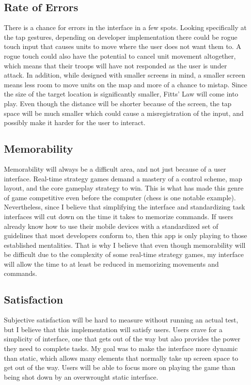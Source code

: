 \documentclass[11pt]{article}
\begin{document}
	\subsection{Rate of Errors}
	There is a chance for errors in the interface in a few spots. Looking specifically at the tap gestures, depending on developer implementation there could be rogue touch input that causes units to move where the user does not want them to. A rogue touch could also have the potential to cancel unit movement altogether, which means that their troops will have not responded as the user is under attack. In addition, while designed with smaller screens in mind, a smaller screen means less room to move units on the map and more of a chance to mistap. Since the size of the target location is significantly smaller, Fitts' Law will come into play. Even though the distance will be shorter because of the screen, the tap space will be much smaller which could cause a misregistration of the input, and possibly make it harder for the user to interact.
	\subsection{Memorability}
	Memorability will always be a difficult area, and not just because of a user interface. Real-time strategy games demand a mastery of a control scheme, map layout, and the core gameplay strategy to win. This is what has made this genre of game competitive even before the computer (chess is one notable example). Nevertheless, since I believe that simplifying the interface and standardizing task interfaces will cut down on the time it takes to memorize commands. %
If users already know how to use their mobile devices with a standardized set of guidelines that most developers conform to, then this app is only playing to those established mentalities. That is why I believe that even though memorability will be difficult due to the complexity of some real-time strategy games, my interface will allow the time to at least be reduced in memorizing movements and commands.
	\subsection{Satisfaction}
	Subjective satisfaction will be hard to measure without running an actual test, but I believe that this implementation will satisfy users. Users crave for a simplicity of interface, one that gets out of the way but also provides the power they need to complete tasks. My goal was to make the interface more dynamic than static, which allows many elements that normally take up screen space to get out of the way. Users will be able to focus more on playing the game than being shot down by an overwrought static interface.

%
\end{document}
